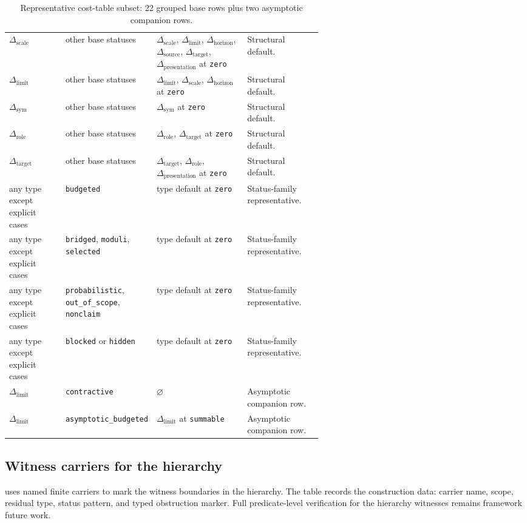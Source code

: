\documentclass[11pt]{article}
\newcommand{\Dpresentation}{\Delta_{\mathrm{presentation}}}
\newcommand{\Dsource}{\Delta_{\mathrm{source}}}
\newcommand{\Dhorizon}{\Delta_{\mathrm{horizon}}}
\newcommand{\Dscale}{\Delta_{\mathrm{scale}}}
\newcommand{\Dlimit}{\Delta_{\mathrm{limit}}}
\newcommand{\Dsym}{\Delta_{\mathrm{sym}}}
\newcommand{\Drole}{\Delta_{\mathrm{role}}}
\newcommand{\Dtarget}{\Delta_{\mathrm{target}}}
\theoremstyle{definition}
\begin{document}
\begin{table}[!ht]
\begin{tabularx}{\linewidth}{>{\raggedright\arraybackslash}p{0.18\linewidth} >{\raggedright\arraybackslash}p{0.18\linewidth} >{\raggedright\arraybackslash}X >{\raggedright\arraybackslash}p{0.24\linewidth}}
    \(\Dscale\) & other base statuses & \(\Dscale\), \(\Dlimit\), \(\Dhorizon\), \(\Dsource\), \(\Dtarget\), \(\Dpresentation\) at \texttt{zero} & Structural default. \\
    \(\Dlimit\) & other base statuses & \(\Dlimit\), \(\Dscale\), \(\Dhorizon\) at \texttt{zero} & Structural default. \\
    \(\Dsym\) & other base statuses & \(\Dsym\) at \texttt{zero} & Structural default. \\
    \(\Drole\) & other base statuses & \(\Drole\), \(\Dtarget\) at \texttt{zero} & Structural default. \\
    \(\Dtarget\) & other base statuses & \(\Dtarget\), \(\Drole\), \(\Dpresentation\) at \texttt{zero} & Structural default. \\
    any type except explicit cases & \texttt{budgeted} & type default at \texttt{zero} & Status-family representative. \\
    any type except explicit cases & \texttt{bridged}, \texttt{moduli}, \texttt{selected} & type default at \texttt{zero} & Status-family representative. \\
    any type except explicit cases & \texttt{probabilistic}, \texttt{out\_of\_scope}, \texttt{nonclaim} & type default at \texttt{zero} & Status-family representative. \\
    any type except explicit cases & \texttt{blocked} or \texttt{hidden} & type default at \texttt{zero} & Status-family representative. \\
    \(\Dlimit\) & \texttt{contractive} & \(\varnothing\) & Asymptotic companion row. \\
    \(\Dlimit\) & \texttt{asymptotic\_budgeted} & \(\Dlimit\) at \texttt{summable} & Asymptotic companion row. \\
    \bottomrule
  \end{tabularx}
  \caption{Representative cost-table subset: 22 grouped base rows plus two asymptotic companion rows.}
  \label{tab:aor-cost-table-representative}
\end{table}

\subsection{Witness carriers for the hierarchy}
\label{subsec:aor-counterexample-carriers}

 uses named finite carriers to mark the witness
boundaries in the hierarchy.  The table records the construction data:
carrier name, scope, residual type, status pattern, and typed obstruction
marker.  Full predicate-level verification for the hierarchy witnesses
remains framework future work.
\end{document}
